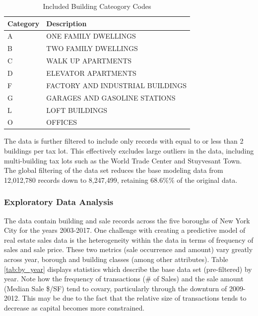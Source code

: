 \documentclass[12pt,]{article}
\begin{document}
\begin{table}

\caption{\label{tab:unnamed-chunk-6}\label{tab:categoryTable} Included Building Cateogory Codes}
\centering
\begin{tabular}[t]{ll}
\toprule
Category & Description\\
\midrule
A & ONE FAMILY DWELLINGS\\
B & TWO FAMILY DWELLINGS\\
C & WALK UP APARTMENTS\\
D & ELEVATOR APARTMENTS\\
F & FACTORY AND INDUSTRIAL BUILDINGS\\
\addlinespace
G & GARAGES AND GASOLINE STATIONS\\
L & LOFT BUILDINGS\\
O & OFFICES\\
\bottomrule
\end{tabular}
\end{table}

The data is further filtered to include only records with equal to or
less than 2 buildings per tax lot. This effectively excludes large
outliers in the data, including multi-building tax lots such as the
World Trade Center and Stuyvesant Town. The global filtering of the data
set reduces the base modeling data from 12,012,780 records down to
8,247,499, retaining 68.6\%\% of the original data.

\hypertarget{exploratory-data-analysis}{%
\subsubsection{Exploratory Data
Analysis}\label{exploratory-data-analysis}}

The data contain building and sale records across the five boroughs of
New York City for the years 2003-2017. One challenge with creating a
predictive model of real estate sales data is the heterogeneity within
the data in terms of frequency of sales and sale price. These two
metrics (sale occurrence and amount) vary greatly across year, borough
and building classes (among other attributes). Table \ref{tab:by_year}
displays statistics which describe the base data set (pre-filtered) by
year. Note how the frequency of transactions (\# of Sales) and the sale
amount (Median Sale \$/SF) tend to covary, particularly through the
downturn of 2009-2012. This may be due to the fact that the relative
size of transactions tends to decrease as capital becomes more
constrained.
\end{document}
